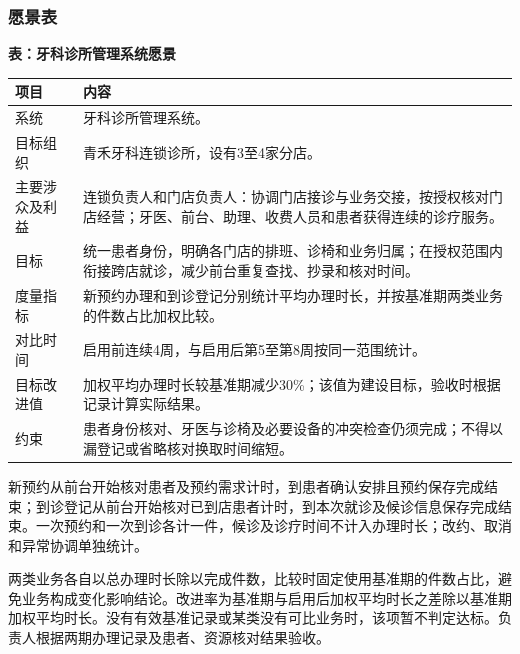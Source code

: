 \documentclass[UTF8,a4paper,zihao=-4,fontset=none]{ctexart}
\begin{document}
\clearpage
\subsubsection{愿景表}
{\small\setlength{\tabcolsep}{3pt}\renewcommand{\arraystretch}{1.13}
\noindent\textbf{表\thetable：牙科诊所管理系统愿景}\par\smallskip
\noindent\begin{tabular}{@{}>{\raggedright\arraybackslash}p{2.944cm}>{\raggedright\arraybackslash}p{12.756cm}@{}}
\toprule
项目 & 内容 \\ \midrule
系统 & 牙科诊所管理系统。 \\
目标组织 & 青禾牙科连锁诊所，设有3至4家分店。 \\
主要涉众及利益 & 连锁负责人和门店负责人：协调门店接诊与业务交接，按授权核对门店经营；牙医、前台、助理、收费人员和患者获得连续的诊疗服务。 \\
目标 & 统一患者身份，明确各门店的排班、诊椅和业务归属；在授权范围内衔接跨店就诊，减少前台重复查找、抄录和核对时间。 \\
度量指标 & 新预约办理和到诊登记分别统计平均办理时长，并按基准期两类业务的件数占比加权比较。 \\
对比时间 & 启用前连续4周，与启用后第5至第8周按同一范围统计。 \\
目标改进值 & 加权平均办理时长较基准期减少30\%；该值为建设目标，验收时根据记录计算实际结果。 \\
约束 & 患者身份核对、牙医与诊椅及必要设备的冲突检查仍须完成；不得以漏登记或省略核对换取时间缩短。 \\
\bottomrule
\end{tabular}\par}
\medskip
新预约从前台开始核对患者及预约需求计时，到患者确认安排且预约保存完成结束；到诊登记从前台开始核对已到店患者计时，到本次就诊及候诊信息保存完成结束。一次预约和一次到诊各计一件，候诊及诊疗时间不计入办理时长；改约、取消和异常协调单独统计。\par
两类业务各自以总办理时长除以完成件数，比较时固定使用基准期的件数占比，避免业务构成变化影响结论。改进率为基准期与启用后加权平均时长之差除以基准期加权平均时长。没有有效基准记录或某类没有可比业务时，该项暂不判定达标。负责人根据两期办理记录及患者、资源核对结果验收。\par

\clearpage
\end{document}

